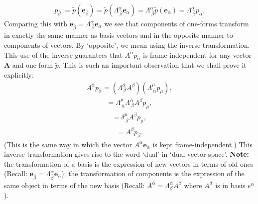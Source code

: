 \documentclass[11pt,letterpaper]{book}
\begin{document}
    \begin{align}
    p_{\bar{\beta}} := \tilde{p}(\mathbf{e}_{\bar{\beta}}) = \tilde{p}(\Lambda^\alpha_{\ \bar{\beta}} \mathbf{e}_\alpha)
    = \Lambda^\alpha_{\ \bar{\beta}} \tilde{p}(\mathbf{e}_\alpha) = \Lambda^\alpha_{\ \bar{\beta}} p_\alpha. \tag{3.9}
    \end{align}
    Comparing this with  \(\mathbf{e}_{\bar{\beta}} = \Lambda^\alpha_{\ \bar{\beta}} \mathbf{e}_\alpha\) we see that components of one-forms transform in exactly the same manner as basis vectors and in the opposite manner to components of vectors. By ‘opposite’, we mean using the inverse transformation. This use of the inverse guarantees that \(A^\alpha p_\alpha\) is frame-independent for any vector \(\mathbf{A}\) and one-form \(\tilde{p}\). This is such an important observation that we shall prove it explicitly:    \begin{align}
    A^{\bar{\alpha}} p_{\bar{\alpha}} = (\Lambda^{\bar{\alpha}}_{\ \beta} A^\beta)(\Lambda^\mu_{\ \bar{\alpha}} p_\mu), \tag{3.10a}
    \end{align}
    \begin{align}
    = \Lambda^\mu_{\ \bar{\alpha}} \Lambda^{\bar{\alpha}}_{\ \beta} A^\beta p_\mu, \tag{3.10b}
    \end{align}
    \begin{align}
    = \delta^\mu_{\ \beta} A^\beta p_\mu, \tag{3.10c}
    \end{align}
    \begin{align}
    = A^\beta p_\beta. \tag{3.10d}
    \end{align}
    (This is the same way in which the vector \(A^{\alpha} \mathbf{e}_{\alpha}\) is kept frame-independent.) This inverse transformation gives rise to the word ‘dual’ in ‘dual vector space’. \textbf{Note:} the transformation of a basis is the expression of new vectors in terms of old ones (Recall: \(\mathbf{e}_{\bar\beta} = \Lambda^{\alpha}_{\bar\beta} \mathbf{e}_{\alpha}\)); the transformation of components is the expression of the same object in terms of the new basis (Recall: \(A^{\bar\alpha}=\Lambda^{\bar\alpha}_{\beta} A^{\beta}\) where $A^{\bar\alpha}$ is in basis $e^{\bar\alpha}$).
\end{document}
